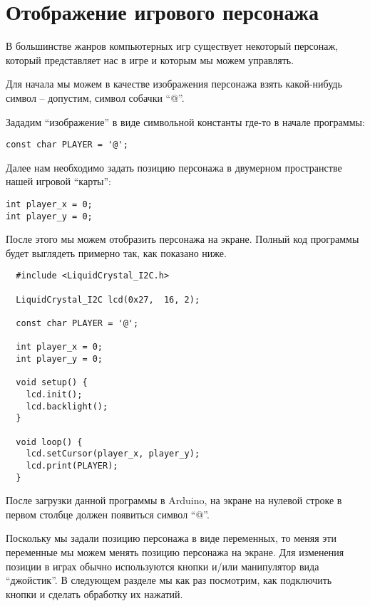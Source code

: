 \documentclass[../sparc.tex]{subfiles}
\begin{document}
\section{Отображение игрового персонажа}

В большинстве жанров компьютерных игр существует некоторый персонаж, который
представляет нас в игре и которым мы можем управлять.

Для начала мы можем в качестве изображения персонажа взять какой-нибудь символ
-- допустим, символ собачки ``@''.

Зададим ``изображение'' в виде символьной константы где-то в начале программы:

\begin{verbatim}
const char PLAYER = '@';
\end{verbatim}

Далее нам необходимо задать позицию персонажа в двумерном пространстве нашей
игровой ``карты'':

\begin{verbatim}
int player_x = 0;
int player_y = 0;
\end{verbatim}

После этого мы можем отобразить персонажа на экране.  Полный код программы будет
выглядеть примерно так, как показано ниже.

\begin{verbatim}
  #include <LiquidCrystal_I2C.h>

  LiquidCrystal_I2C lcd(0x27,  16, 2);

  const char PLAYER = '@';

  int player_x = 0;
  int player_y = 0;

  void setup() {
    lcd.init();
    lcd.backlight();
  }

  void loop() {
    lcd.setCursor(player_x, player_y);
    lcd.print(PLAYER);
  }
\end{verbatim}

После загрузки данной программы в Arduino, на экране на нулевой строке в первом
столбце должен появиться символ ``@''.

Поскольку мы задали позицию персонажа в виде переменных, то меняя эти переменные
мы можем менять позицию персонажа на экране.  Для изменения позиции в играх
обычно используются кнопки и/или манипулятор вида ``джойстик''.  В следующем
разделе мы как раз посмотрим, как подключить кнопки и сделать обработку их
нажатий.
\end{document}
